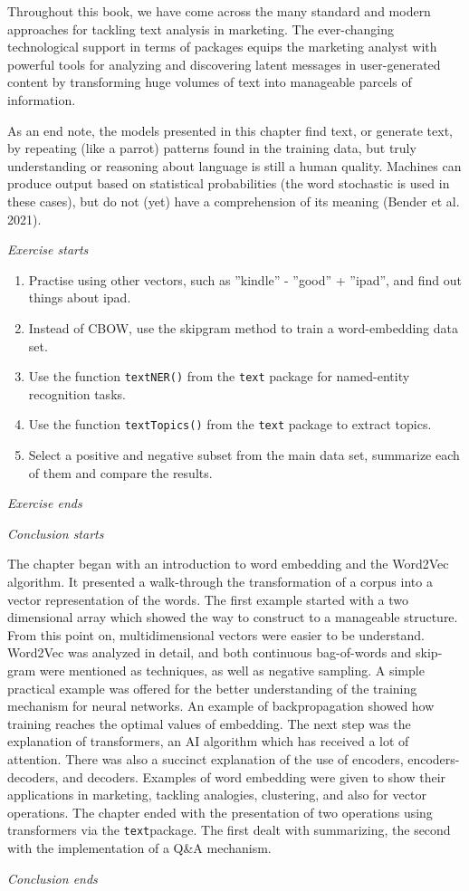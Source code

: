 Throughout this book, we have come across the many standard and modern
approaches for tackling text analysis in marketing. The ever-changing
technological support in terms of packages equips the marketing analyst
with powerful tools for analyzing and discovering latent messages in user-generated content by transforming huge volumes of text into manageable parcels of information.

As an end note, the models presented in this chapter find text, or
generate text, by repeating (like a parrot) patterns found in the
training data, but truly understanding or reasoning about language is
still a human quality. Machines can produce output based on statistical
probabilities (the word stochastic is used in these cases), but do
not (yet) have a comprehension of its meaning (Bender et
al. 2021).

\emph{Exercise starts}

\begin{enumerate}
\def\labelenumi{\arabic{enumi}.}
\tightlist
\item
Practise using other vectors, such as ''kindle'' - ''good'' + ''ipad'', and find out
  things about ipad.
\item
  Instead of CBOW, use the skipgram method to train a word-embedding
  data set.
\item
  Use the function \texttt{textNER()} from the \texttt{text} package for
  named-entity recognition tasks.
\item
  Use the function \texttt{textTopics()} from the \texttt{text} package
  to extract topics.
\item
  Select a positive and negative subset from the main data set, summarize
  each of them and compare the results.
\end{enumerate}

\emph{Exercise ends}

\emph{Conclusion starts}

The chapter began with an introduction to word embedding and the
Word2Vec algorithm. It presented a walk-through the
transformation of a corpus into a vector representation of the words.
The first example started with a two dimensional array which showed the
way to construct to a manageable structure. From this point on, multidimensional
vectors were easier to be understand. Word2Vec was analyzed in detail, and
both continuous bag-of-words and skip-gram were mentioned as techniques, as well as
negative sampling. A simple practical example was offered for the better
understanding of the training mechanism for neural networks.
An example of backpropagation showed how training
reaches the optimal values of embedding. The next step was the explanation
of transformers, an AI algorithm which has received a lot of attention. There was also a succinct explanation of the use of encoders,
encoders-decoders, and decoders. Examples of word embedding
were given to show their applications in marketing, tackling
analogies, clustering, and also for vector operations. The chapter ended with
the presentation of two operations using transformers via the
\texttt{text}package. The first dealt with summarizing, the second with the implementation of a Q\&A mechanism.

\emph{Conclusion ends}